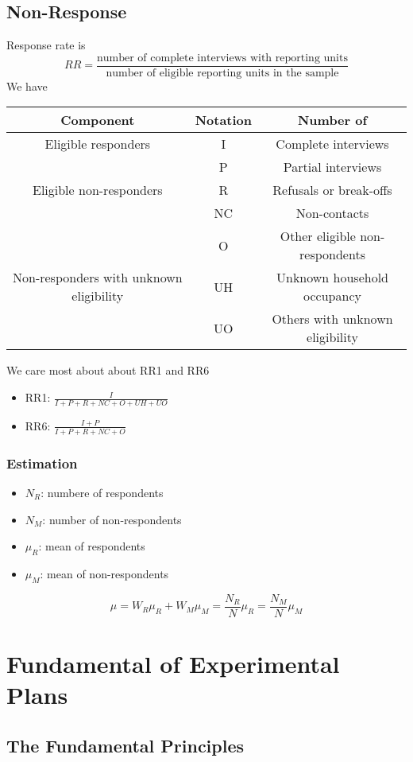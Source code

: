 \documentclass[11pt]{article}
\newcommand{\ds}{\displaystyle}
\begin{document}
\subsection{Non-Response}
Response rate is 
\[RR = \frac{\text{number of complete interviews with reporting units}}{\text{number of eligible reporting units in the sample}}\]
We have \\
\begin{tabular}{c|c|c}
    \textbf{Component} & \textbf{Notation} & \textbf{Number of} \\ \hline
Eligible responders & I & Complete interviews \\ 
 & P & Partial interviews \\ \hline
Eligible non-responders & R & Refusals or break-offs \\ 
 & NC & Non-contacts \\ 
 & O & Other eligible non-respondents \\ \hline
Non-responders with unknown eligibility & UH & Unknown household occupancy \\ 
 & UO & Others with unknown eligibility \\ \hline
\end{tabular}
We care most about about RR1 and RR6
\begin{itemize}
    \item RR1: $\ds\frac{I}{I+P+R+NC+O+UH+UO}$
    \item RR6: $\ds\frac{I+P}{I+P+R+NC+O}$
\end{itemize}
\subsubsection{Estimation}
\begin{itemize}
    \item $N_R$: numbere of respondents 
    \item $N_M$: number of non-respondents
    \item $\mu_R$: mean of respondents
    \item $\mu_M$: mean of non-respondents
\end{itemize}
\[\mu = W_R\mu_R + W_M\mu_M = \frac{N_R}{N}\mu_R = \frac{N_M}{N}\mu_M\]

\section{Fundamental of Experimental Plans}
\subsection{The Fundamental Principles}
\end{document}
